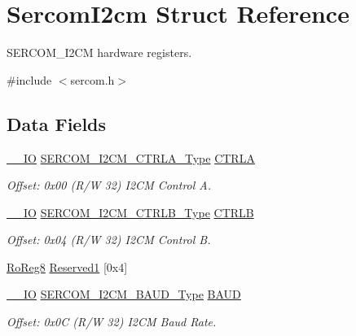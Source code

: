 \hypertarget{struct_sercom_i2cm}{}\section{Sercom\+I2cm Struct Reference}
\label{struct_sercom_i2cm}


S\+E\+R\+C\+O\+M\+\_\+\+I2\+CM hardware registers.  




{\ttfamily \#include $<$sercom.\+h$>$}

\subsection*{Data Fields}
\begin{DoxyCompactItemize}
\item 
\mbox{\hyperlink{core__cm0plus_8h_aec43007d9998a0a0e01faede4133d6be}{\+\_\+\+\_\+\+IO}} \mbox{\hyperlink{union_s_e_r_c_o_m___i2_c_m___c_t_r_l_a___type}{S\+E\+R\+C\+O\+M\+\_\+\+I2\+C\+M\+\_\+\+C\+T\+R\+L\+A\+\_\+\+Type}} \mbox{\hyperlink{struct_sercom_i2cm_a30df6c5167df08b0beb3e7bcea9d1dec}{C\+T\+R\+LA}}
\begin{DoxyCompactList}\small\item\em Offset\+: 0x00 (R/W 32) I2\+CM Control A. \end{DoxyCompactList}\item 
\mbox{\hyperlink{core__cm0plus_8h_aec43007d9998a0a0e01faede4133d6be}{\+\_\+\+\_\+\+IO}} \mbox{\hyperlink{union_s_e_r_c_o_m___i2_c_m___c_t_r_l_b___type}{S\+E\+R\+C\+O\+M\+\_\+\+I2\+C\+M\+\_\+\+C\+T\+R\+L\+B\+\_\+\+Type}} \mbox{\hyperlink{struct_sercom_i2cm_ad5daf679946a0bd5712f70b4af7e73ad}{C\+T\+R\+LB}}
\begin{DoxyCompactList}\small\item\em Offset\+: 0x04 (R/W 32) I2\+CM Control B. \end{DoxyCompactList}\item 
\mbox{\hyperlink{group___s_a_m_d21_e15_a__definitions_ga0d957f1433aaf5d70e4dc2b68288442d}{Ro\+Reg8}} \mbox{\hyperlink{struct_sercom_i2cm_a1106a1fe7c5fa01a183c54b4b992a7f0}{Reserved1}} \mbox{[}0x4\mbox{]}
\item 
\mbox{\hyperlink{core__cm0plus_8h_aec43007d9998a0a0e01faede4133d6be}{\+\_\+\+\_\+\+IO}} \mbox{\hyperlink{union_s_e_r_c_o_m___i2_c_m___b_a_u_d___type}{S\+E\+R\+C\+O\+M\+\_\+\+I2\+C\+M\+\_\+\+B\+A\+U\+D\+\_\+\+Type}} \mbox{\hyperlink{struct_sercom_i2cm_a9287d14348af899d0c2a3251a85de724}{B\+A\+UD}}
\begin{DoxyCompactList}\small\item\em Offset\+: 0x0C (R/W 32) I2\+CM Baud Rate. \end{DoxyCompactList}\item 

\end{DoxyCompactItemize}
